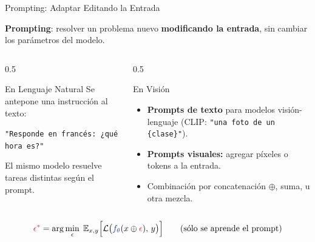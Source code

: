 \documentclass[aspectratio=169, 10pt]{beamer}
\providecommand{\E}{\mathbb{E}}
\newcommand{\ad}[1]{{\color{AdaptRed}#1}}
\newcommand{\fx}[1]{{\color{FixedBlue}#1}}
\newcommand{\formula}[1]{%
	\begin{tcolorbox}[colback=UCMBlue!8, colframe=UCMBlue, arc=4pt,
		boxsep=2pt, left=6pt, right=6pt, top=3pt, bottom=3pt]
		#1
	\end{tcolorbox}
}
\begin{document}
\begin{frame}{Prompting: Adaptar Editando la Entrada}

	\textbf{Prompting}: resolver un problema nuevo \textbf{modificando la entrada}, sin cambiar los par\'ametros del modelo.

	\vspace{0.3cm}

	\begin{columns}[T]
		\begin{column}{0.5\textwidth}
			\begin{block}{En Lenguaje Natural}
				\small
				Se antepone una instrucci\'on al texto:
				\begin{center}
					\texttt{"Responde en franc\'es: ¿qu\'e hora es?"}
				\end{center}
				El mismo modelo resuelve tareas distintas seg\'un el prompt.
			\end{block}
		\end{column}

		\begin{column}{0.5\textwidth}
			\begin{block}{En Visi\'on}
				\small
				\begin{itemize}
					\item \textbf{Prompts de texto} para modelos visi\'on-lenguaje (CLIP: \texttt{"una foto de un \{clase\}"}).
					\item \textbf{Prompts visuales:} agregar p\'ixeles o tokens a la entrada.
					\item Combinaci\'on por concatenaci\'on $\oplus$, suma, u otra mezcla.
				\end{itemize}
			\end{block}
		\end{column}
	\end{columns}

	\vspace{0.3cm}

	\formula{
		\[
		\ad{\epsilon^*} = \arg\min_{\epsilon} \; \E_{x,y}\Big[\mathcal{L}\big(\fx{f_\theta}(x \oplus \ad{\epsilon}),\, y\big)\Big]
		\qquad \text{(s\'olo se aprende el prompt)}
		\]
	}

\end{frame}
\end{document}
